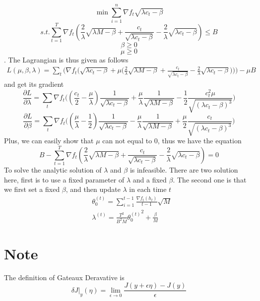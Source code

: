 \documentclass{article}
\begin{document}
\[\min \sum_{i=1}^n \nabla f_t \sqrt{\lambda c_t-\beta}\]
\[s.t. \sum_{t=1}^T\nabla f_t (\frac{2}{\lambda}\sqrt{\lambda M-\beta}+\frac{c_t}{\sqrt{\lambda c_t-\beta}}-\frac{2}{\lambda}\sqrt{\lambda c_t-\beta})\leq B\]
\[\beta\geq 0\]
\[\mu\geq 0\]
. The Lagrangian is thus given as follows
\begin{align}
L(\mu,\beta,\lambda)=\sum_t \bigg( \nabla f_t\Big( \sqrt{\lambda c_t-\beta}+\mu \big(\frac{2}{\lambda}\sqrt{\lambda M-\beta}
+\frac{c_t}{\sqrt{\lambda c_t-\beta}}-\frac{2}{\lambda}\sqrt{\lambda c_t-\beta}\big)\Big)\bigg)-\mu B
\end{align}
and get its gradient
\[\frac{\partial L}{\partial \lambda}=\sum_t \nabla f_t \big((\frac{c_t}{2}-\frac{\mu}{\lambda})\frac{1}{\sqrt{\lambda c_t-\beta}}+\frac{\mu}{\lambda}\frac{1}{\sqrt{\lambda M-\beta}}-\frac{1}{2}\frac{c_t^2\mu}{\sqrt{(\lambda c_t-\beta)^3}}\big)\]
\[\frac{\partial L}{\partial \beta}=\sum_t \nabla f_t \big((\frac{\mu}{\lambda}-\frac{1}{2})\frac{1}{\sqrt{\lambda c_t-\beta}}-\frac{\mu}{\lambda}\frac{1}{\sqrt{\lambda M-\beta}}+\frac{\mu}{2}\frac{c_t}{\sqrt{(\lambda c_t-\beta)^3}}\big)\]
Plus, we can easily show that $\mu$ can not equal to $0$, thus we have the equation
\[B-\sum_{t=1}^T\nabla f_t (\frac{2}{\lambda}\sqrt{\lambda M-\beta}+\frac{c_t}{\sqrt{\lambda c_t-\beta}}-\frac{2}{\lambda}\sqrt{\lambda c_t-\beta})=0\]
To solve the analytic solution of $\lambda$ and $\beta$ is infeasible. There are two solution here, first is to use a fixed parameter of $\lambda$ and a fixed $\beta$. The second one is that we first set a fixed $\beta$, and then update $\lambda$ in each time $t$
\begin{align}
&\theta_0^{(t)}=\sum_{i=1}^{t-1}\frac{\nabla f_t(h_t)}{t-1}\sqrt{M}\\
&\lambda^{(t)}=\frac{T^2}{B^2M}{\theta_0^{(t)}}^2+\frac{\beta}{M}
\end{align}
\section{Note}
The definition of Gateaux Deravative is 
\[\delta J|_y(\eta)=\lim_{\epsilon \to 0} \frac{J(y+\epsilon \eta)-J(y)}{\epsilon}\]
\end{document}

